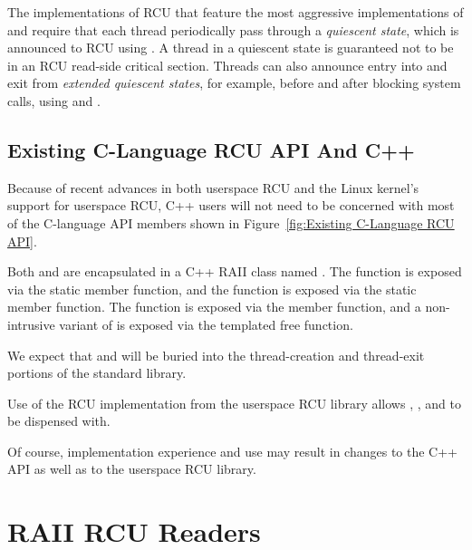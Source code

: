 \documentclass[letterpaper,10pt]{article}
\begin{document}
The implementations of RCU that feature the most aggressive implementations of
 and  require that each thread
periodically pass through a \emph{quiescent state}, which is announced to RCU
using .
A thread in a quiescent state is guaranteed not to be in an RCU
read-side critical section.
Threads can also announce entry into and exit from \emph{extended
quiescent states}, for example, before and after blocking system
calls, using  and .

\subsection{Existing C-Language RCU API And C++}
\label{sec:Existing C-Language RCU API And C++}

Because of recent advances in both userspace RCU and the Linux kernel's
support for userspace RCU, C++ users will not need to be concerned
with most of the C-language API members shown in
Figure~\ref{fig:Existing C-Language RCU API}.

Both  and  are encapsulated
in a C++ RAII class named .
The  function is exposed via the
 static member function, and
the  function is exposed via the
 static member function.
The  function is exposed via the
 member function,
and a non-intrusive variant of  is exposed via the
 templated free function.

We expect that  and 
will be buried into the thread-creation and thread-exit portions of the
standard library.

Use of the  RCU implementation from the userspace
RCU library allows , ,
and  to be dispensed with.

Of course, implementation experience and use may result in changes
to the C++ API as well as to the userspace RCU library.

\section{RAII RCU Readers}
\label{sec:RAII RCU Readers}
\end{document}
